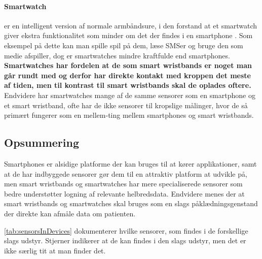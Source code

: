 \paragraph{Smartwatch}
 er en intelligent version af normale armbåndsure, i den forstand at et smartwatch giver ekstra funktionalitet som minder om det der findes i en smartphone \citep{msic:smartwatchstate}. 
Som eksempel på dette kan man spille spil på dem, læse SMSer og bruge den som medie afspiller, dog er smartwatches mindre kraftfulde end smartphones. 
\textbf{Smartwatches har fordelen at de som smart wristbands er noget man går rundt med og derfor har direkte kontakt med kroppen det meste af tiden, men til kontrast til smart wristbands skal de oplades oftere.}
Endvidere har smartwatches mange af de samme sensorer som en smartphone og et smart wristband, ofte har de ikke sensorer til kropslige målinger, hvor de så primært fungerer som en mellem-ting mellem smartphones og smart wristbands.

\subsection{Opsummering}
Smartphones er alsidige platforme der kan bruges til at kører applikationer, samt at de har indbyggede sensorer gør dem til en attraktiv platform at udvikle på, men smart wristbands og smartwatches har mere specialiserede sensorer som bedre understøtter logning af relevante helbredsdata.
Endvidere menes der at smart wristbands og smartwatches skal bruges som en slags påklædningsgenstand der direkte kan afmåle data om patienten.

\cref{tab:sensorsInDevices} dokumenterer hvilke sensorer, som findes i de forskellige slags udstyr. Stjerner indikerer at de kan findes i den slags udstyr, men det er ikke særlig tit at man finder det. %

